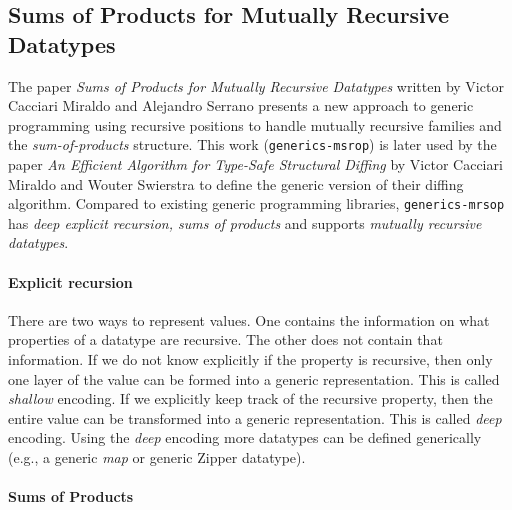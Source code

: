 \subsection{Sums of Products for Mutually Recursive Datatypes}
The paper \textit{Sums of Products for Mutually Recursive Datatypes} written by Victor Cacciari Miraldo and Alejandro Serrano presents a new approach to generic programming using recursive positions to handle mutually recursive families and the \textit{sum-of-products} structure. This work (\texttt{generics-msrop}) is later used by the paper \textit{An Efficient Algorithm for Type-Safe Structural Diffing} by Victor Cacciari Miraldo and Wouter Swierstra\cite{miraldo2019efficient} to define the generic version of their diffing algorithm. Compared to existing generic programming libraries, \texttt{generics-mrsop} has \textit{deep explicit recursion, sums of products} and supports \textit{mutually recursive datatypes}.

\paragraph{Explicit recursion} There are two ways to represent values. One contains the information on what properties of a datatype are recursive. The other does not contain that information. If we do not know explicitly if the property is recursive, then only one layer of the value can be formed into a generic representation. This is called \textit{shallow} encoding. If we explicitly keep track of the recursive property, then the entire value can be transformed into a generic representation. This is called \textit{deep} encoding. Using the \textit{deep} encoding more datatypes can be defined generically (e.g., a generic \textit{map} or generic Zipper datatype).

\paragraph{Sums of Products}


